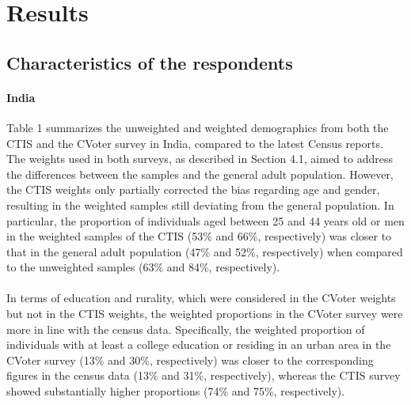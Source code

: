 \documentclass{article}
\begin{document}
\section{Results}

\subsection{Characteristics of the respondents}

\paragraph{India} Table 1 summarizes the unweighted and weighted demographics from both the CTIS and the CVoter survey in India, compared to the latest Census reports. The weights used in both surveys, as described in Section 4.1, aimed to address the differences between the samples and the general adult population. However, the CTIS weights only partially corrected the bias regarding age and gender, resulting in the weighted samples still deviating from the general population. In particular, the proportion of individuals aged between 25 and 44 years old or men in the weighted samples of the CTIS (53\% and 66\%, respectively) was closer to that in the general adult population (47\% and 52\%, respectively) when compared to the unweighted samples (63\% and 84\%, respectively).
\\
\\
In terms of education and rurality, which were considered in the CVoter weights but not in the CTIS weights, the weighted proportions in the CVoter survey were more in line with the census data. Specifically, the weighted proportion of individuals with at least a college education or residing in an urban area in the CVoter survey (13\% and 30\%, respectively) was closer to the corresponding figures in the census data (13\% and 31\%, respectively), whereas the CTIS survey showed substantially higher proportions (74\% and 75\%, respectively).
\end{document}
